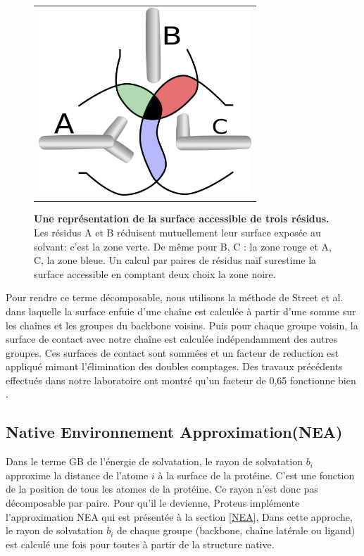    \begin{figure}[!htbp]
     \centering
     \begin{tabular}{c}
       \includegraphics[width=8cm]{figure/intersurface.png} 
     \end{tabular}
     
     \caption{\textbf{Une représentation de la surface accessible de trois résidus.} Les résidus A et B réduisent mutuellement leur surface exposée au solvant: c'est la zone verte. De même pour B, C : la zone rouge et  A, C, la zone bleue. Un calcul par paires de résidus naïf surestime la surface accessible en comptant deux choix la zone noire. }
\label{fig:intersurf}
   \end{figure}


Pour rendre ce terme décomposable, nous utilisons la méthode de Street et al. \cite{Street98} dans laquelle la surface enfuie d'une chaîne est calculée à partir d'une somme sur les chaînes et les groupes du backbone voisins. Puis pour chaque groupe voisin, la surface de contact avec notre chaîne est calculée indépendamment des autres groupes. Ces surfaces de contact sont sommées et un facteur de reduction est appliqué mimant l'élimination des doubles comptages. Des travaux précédents effectués dans notre laboratoire ont montré qu'un facteur de 0,65 fonctionne bien \cite{Lopes07,Gaillard14}.   


\subsection{\og Native Environnement Approximation\fg (NEA)}

Dans le terme GB de l'énergie de solvatation, le rayon de solvatation $b_i$ approxime la distance de l'atome $i$ à la surface de la protéine. C'est une fonction de la position de tous les atomes de la protéine. Ce rayon n'est donc pas décomposable par paire. Pour qu'il le devienne, Proteus implémente l'approximation  NEA qui est présentée à  la section \vref{NEA}, 
Dans cette approche, le rayon de solvatation $b_i$ de chaque groupe (backbone, chaîne latérale ou ligand) est calculé une fois pour toutes à partir de la structure native.

